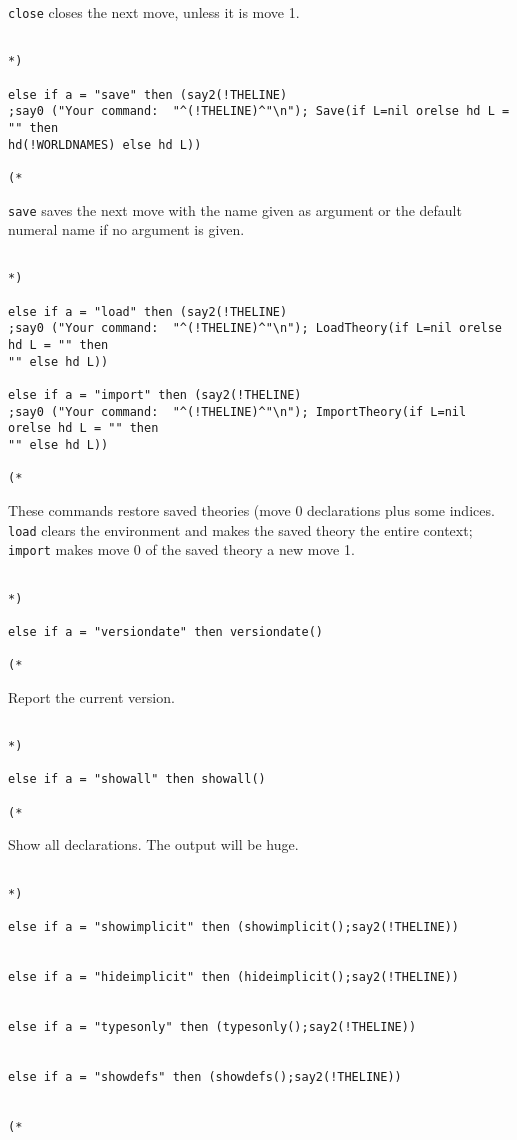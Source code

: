 \documentclass{article}
\begin{document}
{\tt close} closes the next move, unless it is move 1.

\begin{verbatim}

*)

else if a = "save" then (say2(!THELINE)
;say0 ("Your command:  "^(!THELINE)^"\n"); Save(if L=nil orelse hd L = "" then
hd(!WORLDNAMES) else hd L))

(*

\end{verbatim}

{\tt save} saves the next move with the name given as argument or the default numeral name if no argument is given.

\begin{verbatim}

*)

else if a = "load" then (say2(!THELINE)
;say0 ("Your command:  "^(!THELINE)^"\n"); LoadTheory(if L=nil orelse hd L = "" then
"" else hd L))

else if a = "import" then (say2(!THELINE)
;say0 ("Your command:  "^(!THELINE)^"\n"); ImportTheory(if L=nil orelse hd L = "" then
"" else hd L))

(*

\end{verbatim}

These commands restore saved theories (move 0 declarations plus some indices.  {\tt load} clears the environment and makes the saved theory the entire context;  {\tt import} makes move 0 of the saved
theory a new move 1.

\begin{verbatim}

*)

else if a = "versiondate" then versiondate()

(*

\end{verbatim}

Report the current version.

\begin{verbatim}

*)

else if a = "showall" then showall()

(*

\end{verbatim}

Show all declarations.  The output will be huge.

\begin{verbatim}

*)

else if a = "showimplicit" then (showimplicit();say2(!THELINE))


else if a = "hideimplicit" then (hideimplicit();say2(!THELINE))


else if a = "typesonly" then (typesonly();say2(!THELINE))


else if a = "showdefs" then (showdefs();say2(!THELINE))


(*

\end{verbatim}
\end{document}
